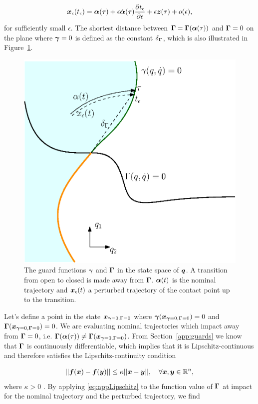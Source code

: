 \documentclass[../DC2017114Bouma.tex]{subfiles}
\begin{document}
\begin{align}
{\boldsymbol{x}}_\epsilon(t_\epsilon) = \boldsymbol{\alpha}(\tau) + \epsilon\dot{\boldsymbol{\alpha}}(\tau)\frac{\partial t_\epsilon}{\partial \epsilon} + \epsilon{\boldsymbol{z}}(\tau) + o(\epsilon),\label{eq:appxpert}
\end{align}
for sufficiently small $\epsilon$. The shortest distance between $\boldsymbol{\Gamma} = \boldsymbol{\Gamma}(\boldsymbol{\alpha}(\tau))$ and $\boldsymbol{\Gamma} = 0$ on the plane where $\boldsymbol{\gamma} = 0$ is defined as the constant $\delta_{\boldsymbol{\Gamma}}$, which is also illustrated in Figure~\ref{fig:impactfromborder}.

\begin{figure}[h]
\centering
\includegraphics[width=.5\textwidth,trim={0cm 2.5cm 2cm 2.4cm},clip]{impactfromborder.eps}\caption{The guard functions $\boldsymbol{\gamma}$ and $\boldsymbol{\Gamma}$ in the state space of ${\boldsymbol{q}}$. A transition from open to closed is made away from $\boldsymbol{\Gamma}$. $\boldsymbol{\alpha}(t)$ is the nominal trajectory and ${\boldsymbol{x}}_\epsilon(t)$ a perturbed trajectory of the contact point up to the transition.} \label{fig:impactfromborder}
\end{figure}

Let's define a point in the state ${\boldsymbol{x}}_{\boldsymbol{\gamma}=0,\boldsymbol{\Gamma}=0}$ where $\boldsymbol{\gamma}({\boldsymbol{x}}_{\boldsymbol{\gamma}=0,\boldsymbol{\Gamma}=0})=0$ and $\boldsymbol{\Gamma}({\boldsymbol{x}}_{\boldsymbol{\gamma}=0,\boldsymbol{\Gamma}=0})=0$. We are evaluating nominal trajectories which impact away from $\boldsymbol{\Gamma} = 0$, i.e. $\boldsymbol{\Gamma}(\boldsymbol{\alpha}(\tau))\neq \boldsymbol{\Gamma}({\boldsymbol{x}}_{\boldsymbol{\gamma}=0,\boldsymbol{\Gamma}=0})$. From Section~\ref{app:guards} we know that $\boldsymbol{\Gamma}$ is continuously differentiable, which implies that it is Lipschitz-continuous and therefore satisfies the Lipschitz-continuity condition

\begin{align}
||{\boldsymbol{f}}({\boldsymbol{x}})-{\boldsymbol{f}}({\boldsymbol{y}})|| \leq \kappa||{\boldsymbol{x}}-{\boldsymbol{y}}||,\quad \forall {\boldsymbol{x}},{\boldsymbol{y}}\in\mathbb{R}^n,\label{eq:appLipschitz}
\end{align}
where $\kappa>0$ \cite{Leine2008}. By applying \eqref{eq:appLipschitz} to the function value of $\boldsymbol{\Gamma}$ at impact for the nominal trajectory and the perturbed trajectory, we find
\end{document}
